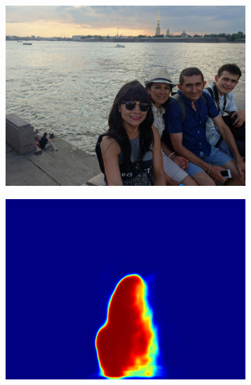 \begin{figure}
	\centering
    \begin{subfigure}[b]{0.33\columnwidth}
            \centering
            \includegraphics[width=\textwidth]{./figures/sample_image.png}
    \label{fig:fig1}
    \end{subfigure}
    \begin{subfigure}[b]{0.33\columnwidth}
            \centering
            \includegraphics[width=\textwidth]{./figures/Mask_1.png}
    \label{fig:fig1}
    \end{subfigure}
     \begin{subfigure}[b]{0.33\columnwidth}

\end{subfigure}
\end{figure}
